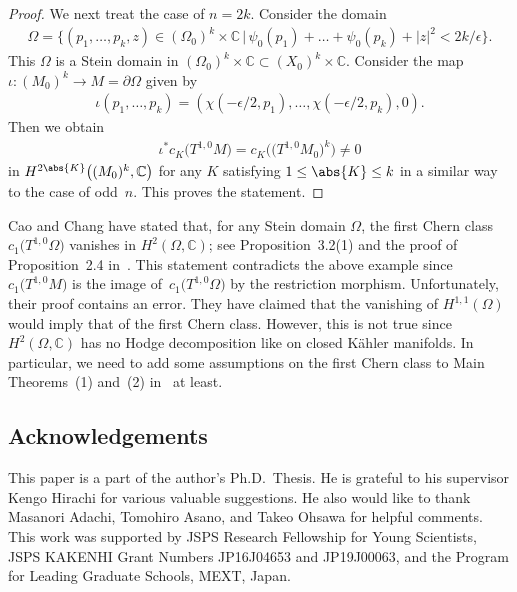 \documentclass[10pt,a4paper]{amsart}
\numberwithin{equation}{section}
\begin{document}
\begin{proof}
We next treat the case of $n = 2 k$. Consider the domain
\begin{gather*}
\Omega= \big\{(p_{1}, \dots , p_{k}, z) \in (\Omega_{0})^{k} \times \mathbb{C}\,\big|\, \psi_{0}(p_{1}) + \dots + \psi_{0}(p_{k}) + |z|^{2} < 2 k / \epsilon\big\}.
\end{gather*}
This $\Omega$ is a Stein domain in $(\Omega_{0})^{k} \times \mathbb{C} \subset (X_{0})^{k} \times \mathbb{C}$.
Consider the map $\iota \colon (M_{0})^{k} \to M = \partial \Omega$ given by
\begin{gather*}
\iota(p_{1}, \dots , p_{k})= (\chi(- \epsilon / 2, p_{1}), \dots , \chi(- \epsilon / 2, p_{k}), 0).
\end{gather*}
Then we obtain
\begin{gather*}
\iota^{*} c_{K}\big(T^{1,0}M\big)= c_{K}\big(\big(T^{1, 0} M_{0}\big)^{k}\big) \neq 0
\end{gather*}
in $H^{2 \abs{K}}\big((M_{0})^{k}, \mathbb{C}\big)$ for any $K$ satisfying $1 \leq \abs{K} \leq k$ in a similar way to the case of odd~$n$. This proves the statement.
\end{proof}

\begin{Remark}Cao and Chang have stated that, for any Stein domain $\Omega$, the first Chern class $c_{1}\big(T^{1,0}\Omega\big)$ vanishes in $H^{2}(\Omega, \mathbb{C})$; see Proposition~3.2(1) and the proof of Proposition~2.4 in~\cite{Cao-Chang07}. This statement contradicts the above example since $c_{1}\big(T^{1,0}M\big)$ is the image of~$c_{1}\big(T^{1,0}\Omega\big)$ by the restriction morphism. Unfortunately, their proof contains an error. They have claimed that the vanishing of $H^{1, 1}(\Omega)$ would imply that of the first Chern class. However, this is not true since $H^{2}(\Omega, \mathbb{C})$ has no Hodge decomposition like on closed K\"{a}hler manifolds. In particular, we need to add some assumptions on the first Chern class to Main Theorems~(1) and~(2) in~\cite{Cao-Chang07} at least.
\end{Remark}

\subsection*{Acknowledgements}
This paper is a part of the author's Ph.D.~Thesis. He is grateful to his supervisor Kengo Hirachi for various valuable suggestions. He also would like to thank Masanori Adachi, Tomohiro Asano, and Takeo Ohsawa for helpful comments. This work was supported by JSPS Research Fellowship for Young Scientists, JSPS KAKENHI Grant Numbers JP16J04653 and JP19J00063, and the Program for Leading Graduate Schools, MEXT, Japan.
\end{document}
